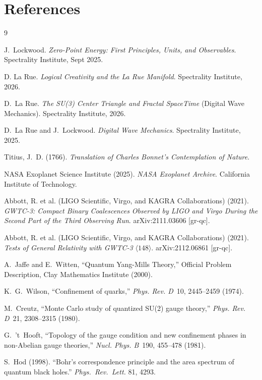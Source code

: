 \section{References}
\begin{thebibliography}{9}


J.~Lockwood.
\textit{Zero-Point Energy: First Principles, Units, and Observables}.
Spectrality Institute, Sept 2025.

D. La Rue.
\textit{Logical Creativity and the La Rue Manifold}.
Spectrality Institute, 2026.

D.~La Rue.
\textit{The SU(3) Center Triangle and Fractal SpaceTime} (Digital Wave Mechanics).
Spectrality Institute, 2026.

D.~La Rue and J.~Lockwood.
\textit{Digital Wave Mechanics}.
Spectrality Institute, 2025.

Titius, J.~D. (1766).
\textit{Translation of Charles Bonnet's Contemplation of Nature}.

NASA Exoplanet Science Institute (2025).
\textit{NASA Exoplanet Archive}. California Institute of Technology.

Abbott, R. et al. (LIGO Scientific, Virgo, and KAGRA Collaborations) (2021).
\textit{GWTC-3: Compact Binary Coalescences Observed by LIGO and Virgo During the Second Part of the Third Observing Run}.
arXiv:2111.03606 [gr-qc].

Abbott, R. et al. (LIGO Scientific, Virgo, and KAGRA Collaborations) (2021).
\textit{Tests of General Relativity with GWTC-3} $\langle 148 \rangle$.
arXiv:2112.06861 [gr-qc].

A.~Jaffe and E.~Witten,
``Quantum Yang-Mills Theory,''
Official Problem Description, Clay Mathematics Institute (2000).

K.~G.~Wilson,
``Confinement of quarks,''
\emph{Phys. Rev. D}\ 10, 2445--2459 (1974).

M.~Creutz,
``Monte Carlo study of quantized SU(2) gauge theory,''
\emph{Phys. Rev. D}\ 21, 2308--2315 (1980).

G.~'t~Hooft,
``Topology of the gauge condition and new confinement phases in non-Abelian gauge theories,''
\emph{Nucl. Phys. B}\ 190, 455--478 (1981).

S.~Hod (1998).
``Bohr's correspondence principle and the area spectrum of quantum black holes.''
\textit{Phys.\ Rev.\ Lett.} 81, 4293.


\end{thebibliography}

